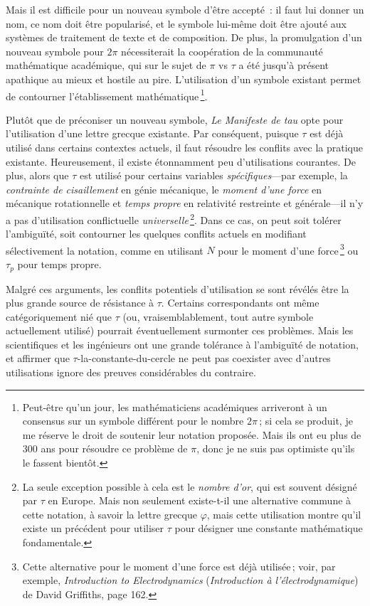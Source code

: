 Mais il est difficile pour un nouveau symbole d'être accepté~: il faut lui
donner un nom, ce nom doit être popularisé, et le symbole lui-même doit être
ajouté aux systèmes de traitement de texte et de composition. De plus, la
promulgation d'un nouveau symbole pour $2\pi$ nécessiterait la coopération de la
communauté mathématique académique, qui sur le sujet de $\pi$ vs $\tau$ a été
jusqu'à présent apathique au mieux et hostile au pire. L'utilisation d'un
symbole existant permet de contourner l'établissement
mathématique\,\footnote{Peut-être qu'un jour, les mathématiciens académiques
arriveront à un consensus sur un symbole différent pour le nombre $2\pi$\,; si
cela se produit, je me réserve le droit de soutenir leur notation proposée. Mais
ils ont eu plus de 300 ans pour résoudre ce problème de $\pi$, donc je ne suis
pas optimiste qu'ils le fassent bientôt.}.

Plutôt que de préconiser un nouveau symbole, \emph{Le Manifeste de tau} opte
pour l'utilisation d'une lettre grecque existante. Par conséquent, puisque
$\tau$ est déjà utilisé dans certains contextes actuels, il faut résoudre les
conflits avec la pratique existante. Heureusement, il existe étonnamment peu
d'utilisations courantes. De plus, alors que $\tau$ est utilisé pour certains
variables \emph{spécifiques}---par exemple, la \emph{contrainte de cisaillement}
en génie mécanique, le \emph{moment d'une force} en mécanique rotationnelle et
\emph{temps propre} en relativité restreinte et générale---il n'y a pas
d'utilisation conflictuelle \emph{universelle}\,\footnote{La seule exception
possible à cela est le \emph{nombre d'or}, qui est souvent désigné par $\tau$ en
Europe. Mais non seulement existe-t-il une alternative commune à cette notation,
à savoir la lettre grecque $\varphi$, mais cette utilisation montre qu'il existe
un précédent pour utiliser $\tau$ pour désigner une constante mathématique
fondamentale.}. Dans ce cas, on peut soit tolérer l'ambiguïté, soit contourner
les quelques conflits actuels en modifiant sélectivement la notation, comme en
utilisant $N$ pour le moment d'une force\,\footnote{Cette alternative pour le
moment d'une force est déjà utilisée\,; voir, par exemple, \emph{Introduction to
Electrodynamics} (\emph{Introduction à l'électrodynamique}) de David Griffiths,
page 162.} ou $\tau_p$ pour temps propre.

Malgré ces arguments, les conflits potentiels d'utilisation se sont révélés être
la plus grande source de résistance à $\tau$. Certains correspondants ont même
catégoriquement nié que $\tau$ (ou, vraisemblablement, tout autre symbole
actuellement utilisé) pourrait éventuellement surmonter ces problèmes. Mais les
scientifiques et les ingénieurs ont une grande tolérance à l'ambiguïté de
notation, et affirmer que $\tau$-la-constante-du-cercle ne peut pas coexister
avec d'autres utilisations ignore des preuves considérables du contraire.

